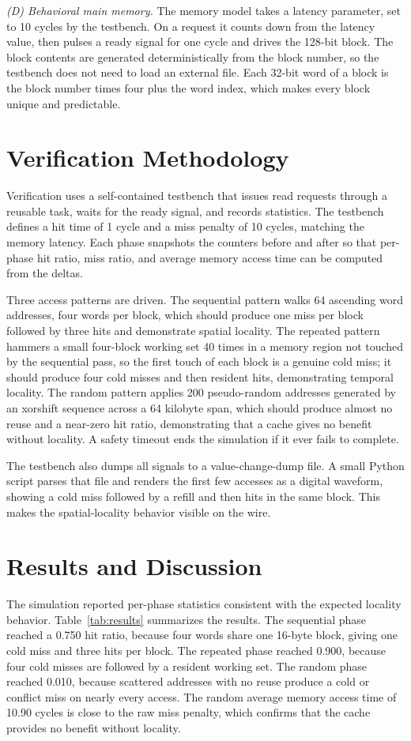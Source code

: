 \documentclass[conference]{IEEEtran}
\begin{document}
\textit{(D) Behavioral main memory.} The memory model takes a latency parameter, set to 10 cycles by the testbench. On a request it counts down from the latency value, then pulses a ready signal for one cycle and drives the 128-bit block. The block contents are generated deterministically from the block number, so the testbench does not need to load an external file. Each 32-bit word of a block is the block number times four plus the word index, which makes every block unique and predictable.

\section{Verification Methodology}
Verification uses a self-contained testbench that issues read requests through a reusable task, waits for the ready signal, and records statistics. The testbench defines a hit time of 1 cycle and a miss penalty of 10 cycles, matching the memory latency. Each phase snapshots the counters before and after so that per-phase hit ratio, miss ratio, and average memory access time can be computed from the deltas.

Three access patterns are driven. The sequential pattern walks 64 ascending word addresses, four words per block, which should produce one miss per block followed by three hits and demonstrate spatial locality. The repeated pattern hammers a small four-block working set 40 times in a memory region not touched by the sequential pass, so the first touch of each block is a genuine cold miss; it should produce four cold misses and then resident hits, demonstrating temporal locality. The random pattern applies 200 pseudo-random addresses generated by an xorshift sequence across a 64 kilobyte span, which should produce almost no reuse and a near-zero hit ratio, demonstrating that a cache gives no benefit without locality. A safety timeout ends the simulation if it ever fails to complete.

The testbench also dumps all signals to a value-change-dump file. A small Python script parses that file and renders the first few accesses as a digital waveform, showing a cold miss followed by a refill and then hits in the same block. This makes the spatial-locality behavior visible on the wire.

\section{Results and Discussion}
The simulation reported per-phase statistics consistent with the expected locality behavior. Table~\ref{tab:results} summarizes the results. The sequential phase reached a 0.750 hit ratio, because four words share one 16-byte block, giving one cold miss and three hits per block. The repeated phase reached 0.900, because four cold misses are followed by a resident working set. The random phase reached 0.010, because scattered addresses with no reuse produce a cold or conflict miss on nearly every access. The random average memory access time of 10.90 cycles is close to the raw miss penalty, which confirms that the cache provides no benefit without locality.
\end{document}
